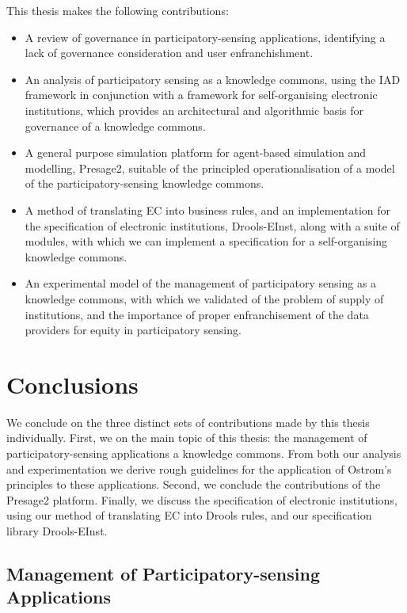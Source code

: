 This thesis makes the following contributions:

\begin{itemize}
\item A review of governance in participatory-sensing applications, identifying a lack of governance consideration and user enfranchishment.
\item An analysis of participatory sensing as a knowledge commons, using the \ac{IAD} framework in conjunction with a framework for self-organising electronic institutions, which provides an architectural and algorithmic basis for governance of a knowledge commons.
\item A general purpose simulation platform for agent-based simulation and modelling, Presage2, suitable of the principled operationalisation of a model of the participatory-sensing knowledge commons.
\item A method of translating \acl{EC} into business rules, and an implementation for the specification of electronic institutions, Drools-EInst, along with a suite of modules, with which we can implement a specification for a self-organising knowledge commons.
\item An experimental model of the management of participatory sensing as a knowledge commons, with which we validated of the problem of supply of institutions, and the importance of proper enfranchisement of the data providers for equity in participatory sensing.
\end{itemize}

\section{Conclusions}

We conclude on the three distinct sets of contributions made by this thesis
individually. First, we on the main topic of this thesis: the management of
participatory-sensing applications a knowledge commons. From both our analysis
and experimentation we derive rough guidelines for the application of Ostrom's
principles to these applications. Second, we conclude the contributions of the
Presage2 platform. Finally, we discuss the specification of electronic
institutions, using our method of translating \ac{EC} into Drools rules, and
our specification library Drools-EInst.

\subsection{Management of Participatory-sensing Applications}

